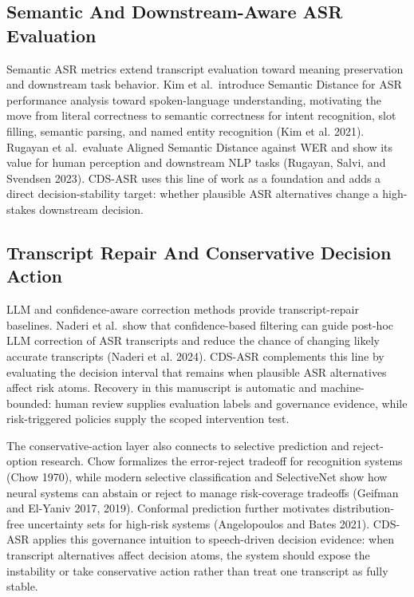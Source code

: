 \documentclass[
]{article}
\begin{document}
\hypertarget{semantic-and-downstream-aware-asr-evaluation}{%
\subsection{Semantic And Downstream-Aware ASR
Evaluation}\label{semantic-and-downstream-aware-asr-evaluation}}

Semantic ASR metrics extend transcript evaluation toward meaning
preservation and downstream task behavior. Kim et al.~introduce Semantic
Distance for ASR performance analysis toward spoken-language
understanding, motivating the move from literal correctness to semantic
correctness for intent recognition, slot filling, semantic parsing, and
named entity recognition (Kim et al. 2021). Rugayan et al.~evaluate
Aligned Semantic Distance against WER and show its value for human
perception and downstream NLP tasks (Rugayan, Salvi, and Svendsen 2023).
CDS-ASR uses this line of work as a foundation and adds a direct
decision-stability target: whether plausible ASR alternatives change a
high-stakes downstream decision.

\hypertarget{transcript-repair-and-conservative-decision-action}{%
\subsection{Transcript Repair And Conservative Decision
Action}\label{transcript-repair-and-conservative-decision-action}}

LLM and confidence-aware correction methods provide transcript-repair
baselines. Naderi et al.~show that confidence-based filtering can guide
post-hoc LLM correction of ASR transcripts and reduce the chance of
changing likely accurate transcripts (Naderi et al. 2024). CDS-ASR
complements this line by evaluating the decision interval that remains
when plausible ASR alternatives affect risk atoms. Recovery in this
manuscript is automatic and machine-bounded: human review supplies
evaluation labels and governance evidence, while risk-triggered policies
supply the scoped intervention test.

The conservative-action layer also connects to selective prediction and
reject-option research. Chow formalizes the error-reject tradeoff for
recognition systems (Chow 1970), while modern selective classification
and SelectiveNet show how neural systems can abstain or reject to manage
risk-coverage tradeoffs (Geifman and El-Yaniv 2017, 2019). Conformal
prediction further motivates distribution-free uncertainty sets for
high-risk systems (Angelopoulos and Bates 2021). CDS-ASR applies this
governance intuition to speech-driven decision evidence: when transcript
alternatives affect decision atoms, the system should expose the
instability or take conservative action rather than treat one transcript
as fully stable.
\end{document}
